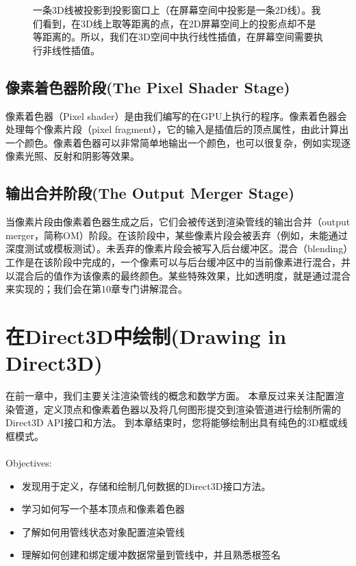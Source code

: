 \documentclass[11pt,a4paper,oldfontcommands]{memoir}
\begin{document}
{\begin{figure}[h]
    \centering
    \caption{一条3D线被投影到投影窗口上（在屏幕空间中投影是一条2D线）。我们看到，在3D线上取等距离的点，在2D屏幕空间上的投影点却不是等距离的。所以，我们在3D空间中执行线性插值，在屏幕空间需要执行非线性插值。}
    \label{fig:5-34}
\end{figure}

\section{像素着色器阶段(The Pixel Shader Stage)}
\begin{flushleft}
像素着色器（Pixel shader）是由我们编写的在GPU上执行的程序。像素着色器会处理每个像素片段（pixel fragment），它的输入是插值后的顶点属性，由此计算出一个颜色。像素着色器可以非常简单地输出一个颜色，也可以很复杂，例如实现逐像素光照、反射和阴影等效果。
\end{flushleft}
\section{输出合并阶段(The Output Merger Stage)}
\begin{flushleft}
当像素片段由像素着色器生成之后，它们会被传送到渲染管线的输出合并（output
merger，简称OM）阶段。在该阶段中，某些像素片段会被丢弃（例如，未能通过深度测试或模板测试）。未丢弃的像素片段会被写入后台缓冲区。混合（blending）工作是在该阶段中完成的，一个像素可以与后台缓冲区中的当前像素进行混合，并以混合后的值作为该像素的最终颜色。某些特殊效果，比如透明度，就是通过混合来实现的；我们会在第10章专门讲解混合。
\end{flushleft}

\chapter{在Direct3D中绘制(Drawing in Direct3D)}
\begin{flushleft}
在前一章中，我们主要关注渲染管线的概念和数学方面。 本章反过来关注配置渲染管道，定义顶点和像素着色器以及将几何图形提交到渲染管道进行绘制所需的Direct3D API接口和方法。 到本章结束时，您将能够绘制出具有纯色的3D框或线框模式。\\
~\\
{\large Objectives:}
\begin{itemize}
    \item 发现用于定义，存储和绘制几何数据的Direct3D接口方法。
    \item 学习如何写一个基本顶点和像素着色器
    \item 了解如何用管线状态对象配置渲染管线
    \item 理解如何创建和绑定缓冲数据常量到管线中，并且熟悉根签名
\end{itemize}
\end{flushleft}
}
\end{document}
